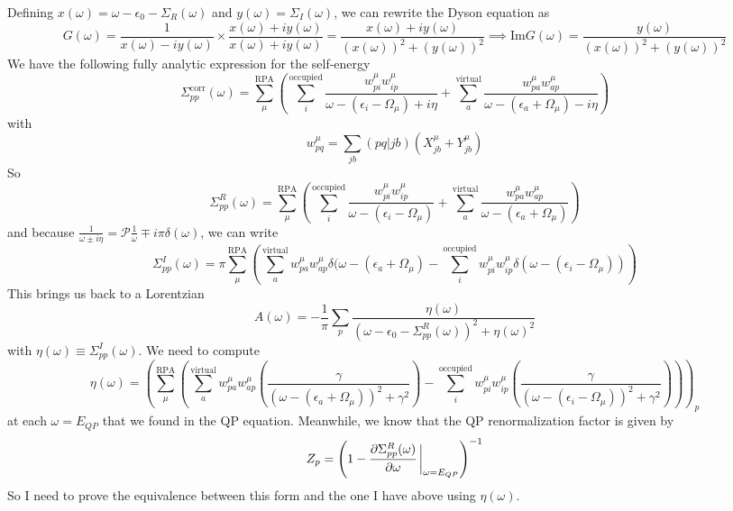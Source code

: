 Defining $x(\omega) = \omega - \epsilon_0 - \Sigma_R(\omega)$ and $y(\omega) = \Sigma_I(\omega)$, we can rewrite the Dyson equation as
\begin{equation}
    G(\omega) = \frac{1}{x(\omega) - iy(\omega)}\times \frac{x(\omega) + iy(\omega)}{x(\omega) + iy(\omega)} = \frac{x(\omega) + iy(\omega)}{\left(x(\omega)\right)^2 + \left(y(\omega)\right)^2} \implies \text{Im} G(\omega) = \frac{y(\omega)}{\left(x(\omega)\right)^2 + \left(y(\omega)\right)^2}
\end{equation}
We have the following fully analytic expression for the self-energy
\begin{equation}
    \Sigma_{pp}^{\text{corr}}(\omega) = \sum_{\mu }^{\text{RPA}}\left(\sum_{i}^{\text{occupied}} \frac{w_{pi}^{\mu }w_{ip}^{\mu }}{\omega -(\epsilon _{i}-\Omega  _{\mu })+i\eta}+ \sum_{a}^{\text{virtual}} \frac{w_{pa}^{\mu }w_{ap}^{\mu }}{\omega -(\epsilon _{a}+\Omega  _{\mu })-i\eta}\right)
\end{equation}
with
\begin{equation}
    w_{pq}^{\mu} = \sum_{jb} (pq|jb) \left(X_{jb}^{\mu} + Y_{jb}^{\mu}\right)
\end{equation}
So
\begin{equation}
    \Sigma^R_{pp}(\omega) = \sum_{\mu }^{\text{RPA}}\left(\sum_{i}^{\text{occupied}} \frac{w_{pi}^{\mu }w_{ip}^{\mu }}{\omega -(\epsilon _{i}-\Omega  _{\mu })}+ \sum_{a}^{\text{virtual}} \frac{w_{pa}^{\mu }w_{ap}^{\mu }}{\omega -(\epsilon _{a}+\Omega  _{\mu })}\right)
\end{equation}
and because $\frac{1}{\omega \pm i\eta} = \mathcal{P}\frac{1}{\omega} \mp i\pi \delta(\omega)$, we can write
\begin{equation}
    \Sigma^I_{pp}(\omega) = \pi \sum_{\mu }^{\text{RPA}}\left(\sum_{a}^{\text{virtual}} {w_{pa}^{\mu }w_{ap}^{\mu }} \delta(\omega - (\epsilon _{a}+\Omega  _{\mu })-\sum_{i}^{\text{occupied}} {w_{pi}^{\mu }w_{ip}^{\mu }} \delta(\omega - (\epsilon _{i}-\Omega  _{\mu }))\right)
\end{equation}
This brings us back to a Lorentzian
\begin{equation}
    A(\omega) = -\frac{1}{\pi}\sum_p\frac{\eta(\omega)}{\left(\omega - \epsilon_0 - \Sigma^R_{pp}(\omega)\right)^2 + \eta(\omega)^2}
\end{equation}
with $\eta(\omega)\equiv \Sigma^I_{pp}(\omega)$. We need to compute
\begin{equation}
    \eta(\omega) = \left(\sum_{\mu }^{\text{RPA}}\left(\sum_{a}^{\text{virtual}} {w_{pa}^{\mu }w_{ap}^{\mu }} \left(\frac{\gamma}{\left(\omega - (\epsilon _{a}+\Omega  _{\mu })\right)^2 + \gamma^2}\right)-\sum_{i}^{\text{occupied}} {w_{pi}^{\mu }w_{ip}^{\mu }} \left(\frac{\gamma}{\left(\omega - (\epsilon _{i}-\Omega  _{\mu })\right)^2 + \gamma^2}\right)\right)\right)_{p}
\end{equation}
at each $\omega = E_{QP}$ that we found in the QP equation.
Meanwhile, we know that the QP renormalization factor is given by
\begin{equation}
    Z_{p} = \left(1 - \frac{\partial \Sigma^R_{pp}(\omega)}{\partial \omega}\eval_{\omega = E_{QP}}\right)^{-1}
\end{equation}
So I need to prove the equivalence between this form and the one I have above using $\eta(\omega)$.

